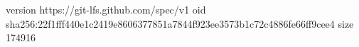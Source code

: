 version https://git-lfs.github.com/spec/v1
oid sha256:22f1fff440e1c2419e8606377851a7844f923ee3573b1c72c4886fe66ff9cee4
size 174916

